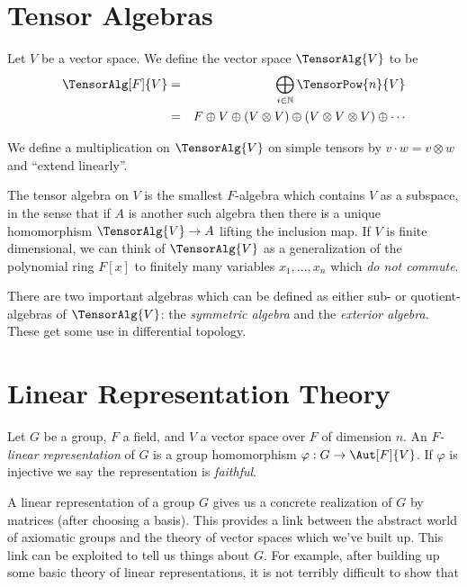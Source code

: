 \documentclass{memoir}
\begin{document}
\setcounter{section}{22}
\section{Tensor Algebras}

\begin{dfn}
Let $V$ be a vector space. We define the vector space $\TensorAlg{V}$ to be 
\begin{eqnarray*}
\TensorAlg[F]{V} & = & \bigoplus_{i \in \mathbb{N}} \TensorPow{n}{V} \\
 & = & F \oplus V \oplus (V \otimes V) \oplus (V \otimes V \otimes V) \oplus \cdots
\end{eqnarray*}

We define a multiplication on $\TensorAlg{V}$ on simple tensors by $v \cdot w = v \otimes w$ and ``extend linearly''.
\end{dfn}

The tensor algebra on $V$ is the smallest $F$-algebra which contains $V$ as a subspace, in the sense that if $A$ is another such algebra then there is a unique homomorphism $\TensorAlg{V} \rightarrow A$ lifting the inclusion map. If $V$ is finite dimensional, we can think of $\TensorAlg{V}$ as a generalization of the polynomial ring $F[x]$ to finitely many variables $x_1,\ldots,x_n$ which \emph{do not commute}.

There are two important algebras which can be defined as either sub- or quotient-algebras of $\TensorAlg{V}$: the \emph{symmetric algebra} and the \emph{exterior algebra}. These get some use in differential topology.

\section{Linear Representation Theory}

\begin{dfn}
Let $G$ be a group, $F$ a field, and $V$ a vector space over $F$ of dimension $n$. An \emph{$F$-linear representation} of $G$ is a group homomorphism $\varphi : G \rightarrow \Aut[F]{V}$. If $\varphi$ is injective we say the representation is \emph{faithful}.
\end{dfn}

A linear representation of a group $G$ gives us a concrete realization of $G$ by matrices (after choosing a basis). This provides a link between the abstract world of axiomatic groups and the theory of vector spaces which we've built up. This link can be exploited to tell us things about $G$. For example, after building up some basic theory of linear representations, it is not terribly difficult to show that
\end{document}
